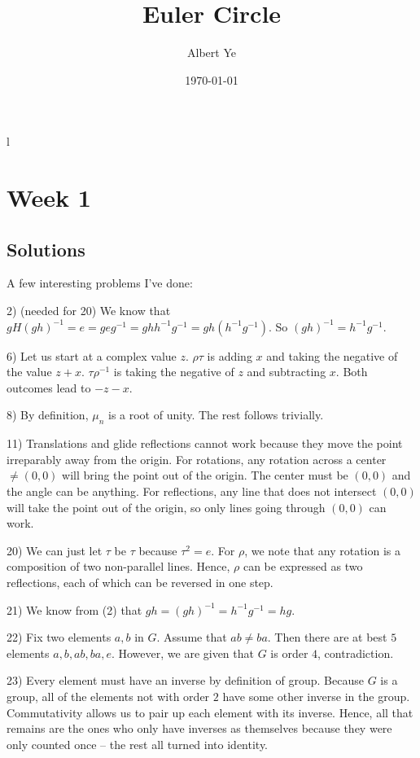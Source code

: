 l\documentclass{scrartcl}
\title{Euler Circle}
\author{Albert Ye}
\date{\today}
\begin{document}
\maketitle

\section{Week 1}
\subsection{Solutions}
A few interesting problems I've done:

2) (needed for 20) We know that $gH(gh)^{-1} = e = geg^{-1} = ghh^{-1}g^{-1} = gh(h^{-1}g^{-1})$. So $(gh)^{-1} = h^{-1}g^{-1}$. \blackqed

6) Let us start at a complex value $z$. $\rho \tau$ is adding $x$ and taking the negative of the value $z+x$. $\tau \rho^{-1}$ is taking the negative of $z$ and subtracting $x$. Both outcomes lead to $-z-x$. \blackqed

8) By definition, $\mu_n$ is a root of unity. The rest follows trivially. \blackqed

11) Translations and glide reflections cannot work because they move the point irreparably away from the origin. For rotations, any rotation across a center $\ne (0, 0)$ will bring the point out of the origin. The center must be $(0,0)$ and the angle can be anything. For reflections, any line that does not intersect $(0,0)$ will take the point out of the origin, so only lines going through $(0,0)$ can work.

20) We can just let $\tau$ be $\tau$ because $\tau^2 = e$. For $\rho$, we note that any rotation is a composition of two non-parallel lines. Hence, $\rho$ can be expressed as two reflections, each of which can be reversed in one step. \blackqed 

21) We know from (2) that $gh = (gh)^{-1} = h^{-1}g^{-1} = hg$. \blackqed 

22) Fix two elements $a,b$ in $G$. Assume that $ab \ne ba$. Then there are at best $5$ elements $a,b,ab,ba,e$. However, we are given that $G$ is order $4$, contradiction. \blackqed

23) Every element must have an inverse by definition of group. Because $G$ is a group, all of the elements not with order $2$ have some other inverse in the group. Commutativity allows us to pair up each element with its inverse. Hence, all that remains are the ones who only have inverses as themselves because they were only counted once -- the rest all turned into identity. 
\end{document}

